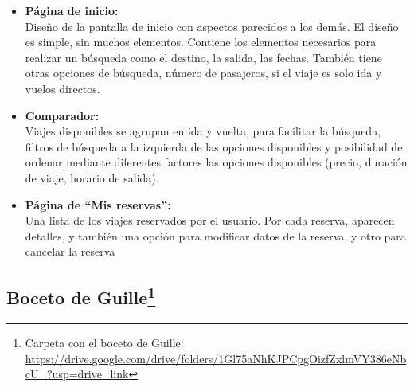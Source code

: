 \begin{itemize}
    \item\textbf{Página de inicio:} \\ Diseño de la pantalla de inicio con aspectos parecidos a los demás. El diseño es simple, sin muchos elementos. Contiene los elementos necesarios para realizar un búsqueda como el destino, la salida, las fechas. También tiene otras opciones de búsqueda, número de pasajeros, si el viaje es solo ida y vuelos directos.
    \item\textbf{Comparador:} \\ Viajes disponibles se agrupan en ida y vuelta, para facilitar la búsqueda, filtros de búsqueda a la izquierda de las opciones disponibles y posibilidad de ordenar mediante diferentes factores las opciones disponibles (precio, duración de viaje, horario de salida).
    \item\textbf{Página de ``Mis reservas'':} \\ Una lista de los viajes reservados por el usuario. Por cada reserva, aparecen detalles, y también una opción para modificar datos de la reserva, y otro para cancelar la reserva
    
\end{itemize}

\subsection[Boceto de Guille]{Boceto de Guille\footnote{Carpeta con el boceto de Guille: \url{https://drive.google.com/drive/folders/1Gl75aNhKJPCpgOizfZxlmVY386eNbcU_?usp=drive_link}}}

